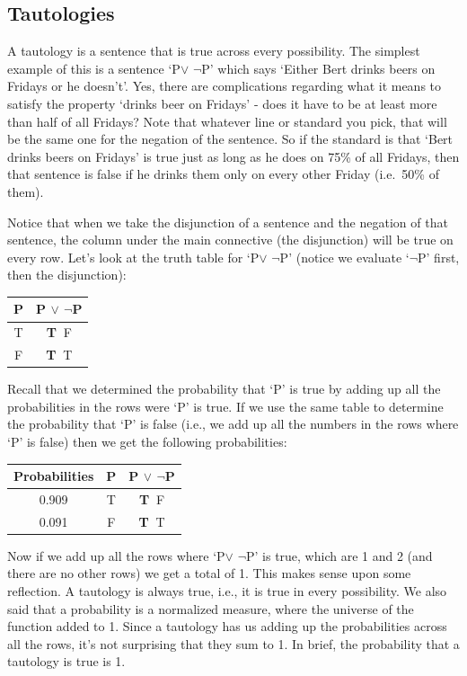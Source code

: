\documentclass[]{tufte-book}
\begin{document}
\hypertarget{tautologies}{%
\subsection{Tautologies}\label{tautologies}}

A tautology is a sentence that is true across every possibility. The simplest example of this is a sentence `P\(\vee\) \(\neg\)P' which says `Either Bert drinks beers on Fridays or he doesn't'. Yes, there are complications regarding what it means to satisfy the property `drinks beer on Fridays' - does it have to be at least more than half of all Fridays? Note that whatever line or standard you pick, that will be the same one for the negation of the sentence. So if the standard is that `Bert drinks beers on Fridays' is true just as long as he does on 75\% of all Fridays, then that sentence is false if he drinks them only on every other Friday (i.e.~50\% of them).

Notice that when we take the disjunction of a sentence and the negation of that sentence, the column under the main connective (the disjunction) will be true on every row. Let's look at the truth table for `P\(\vee\) \(\neg\)P' (notice we evaluate `\(\neg\)P' first, then the disjunction):

\begin{longtable}[]{@{}cc@{}}
\toprule
P & P \(\vee\) \(\neg\)P\tabularnewline
\midrule
\endhead
T & \textbf{T\(~\)} F\tabularnewline
F & \textbf{T\(~\)} T\tabularnewline
\bottomrule
\end{longtable}

Recall that we determined the probability that `P' is true by adding up all the probabilities in the rows were `P' is true. If we use the same table to determine the probability that `P' is false (i.e., we add up all the numbers in the rows where `P' is false) then we get the following probabilities:

\begin{longtable}[]{@{}ccc@{}}
\toprule
Probabilities & P & P \(\vee\) \(\neg\)P\tabularnewline
\midrule
\endhead
0.909 & T & \textbf{T\(~\)} F\tabularnewline
0.091 & F & \textbf{T\(~\)} T\tabularnewline
\bottomrule
\end{longtable}

Now if we add up all the rows where `P\(\vee\) \(\neg\)P' is true, which are 1 and 2 (and there are no other rows) we get a total of 1. This makes sense upon some reflection. A tautology is always true, i.e., it is true in every possibility. We also said that a probability is a normalized measure, where the universe of the function added to 1. Since a tautology has us adding up the probabilities across all the rows, it's not surprising that they sum to 1. In brief, the probability that a tautology is true is 1.
\end{document}
